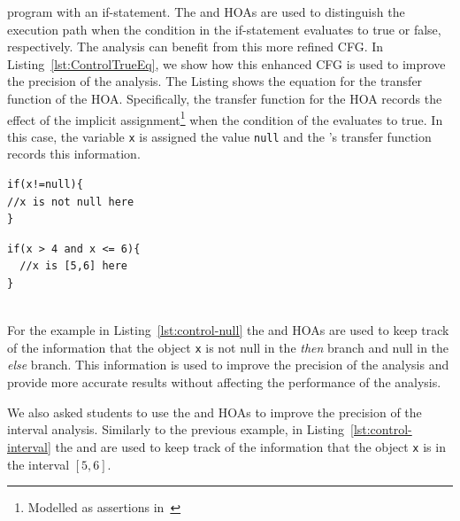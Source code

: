 program with an if-statement. The  and  HOAs are
used to distinguish the execution path when the condition in the if-statement evaluates to 
true or false, respectively. The  analysis can benefit from this more refined CFG.
In Listing~\ref{lst:ControlTrueEq}, we show how this enhanced CFG is used to improve the precision of the analysis.
The Listing shows the equation for the transfer function of the  HOA.
Specifically, the transfer function for the  HOA
records the effect of the implicit assignment\footnote{Modelled as assertions in~\cite{spa}} when the condition of the  evaluates to true.
In this case, the variable \texttt{x} is assigned the value \texttt{null} and the 's transfer function
records this information.

\begin{minipage}{0.45\textwidth}
  \begin{lstlisting}[language=JastAdd,caption={Control sensitivity to improve null pointer analysis.}, label={lst:control-null}]
if(x!=null){
//x is not null here
}
  \end{lstlisting}
  \end{minipage}\hfill%
  \begin{minipage}{0.45\textwidth}
  \begin{lstlisting}[language=JastAdd,caption={Control sensitivity to improve interval analysis.}, label={lst:control-interval}]
if(x > 4 and x <= 6){
  //x is [5,6] here
}
  \end{lstlisting}
\end{minipage}\\
For the example in Listing~\ref{lst:control-null} the  and 
HOAs are used to keep track of the information that the object \texttt{x} is not null
in the \emph{then} branch and null in the \emph{else} branch.
This information is used to improve the precision of the analysis and provide
more accurate results without affecting the performance of the analysis.

We also asked students to use the  and 
HOAs to improve the precision of the interval analysis. Similarly to the previous example, in 
Listing~\ref{lst:control-interval} the  and 
are used to keep track of the information that the object \texttt{x} is in the interval $[5,6]$.


